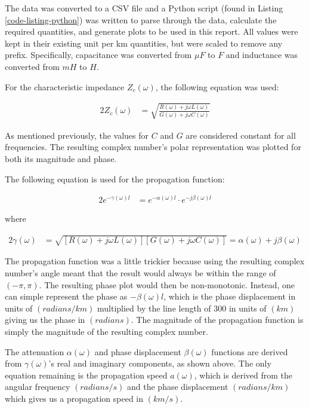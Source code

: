 \documentclass[10pt, oneside, letterpaper]{article}
\begin{document}
The data was converted to a CSV file and a Python script (found in Listing \ref{code-listing-python}) was written to parse through the data, calculate the required quantities, and generate plots to be used in this report. All values were kept in their existing unit per km quantities, but were scaled to remove any prefix. Specifically, capacitance was converted from $\mu{}F$ to $F$ and inductance was converted from $mH$ to $H$.

For the characteristic impedance $Z_c(\omega)$, the following equation was used:

\begin{alignat}{2}
Z_c(\omega) &= \sqrt{\frac{R(\omega{}) + j\omega{}L(\omega{})}{G(\omega{}) + j\omega{}C(\omega{})}}
\end{alignat}

As mentioned previously, the values for $C$ and $G$ are considered constant for all frequencies. The resulting complex number's polar representation was plotted for both its magnitude and phase.

The following equation is used for the propagation function:

\begin{alignat}{2}
e^{-\gamma{}(\omega{})l} &= e^{-\alpha{}(\omega{})l}\cdot{}e^{-j\beta{}(\omega{})l}
\end{alignat}

where

\begin{alignat}{2}
\gamma{}(\omega{}) &= \sqrt{\left[R(\omega{})+j\omega{}L(\omega{})\right]\left[G(\omega{})+j\omega{}C(\omega{})\right]} = \alpha(\omega{}) + j\beta(\omega{})
\end{alignat}

The propagation function was a little trickier because using the resulting complex number's angle meant that the result would always be within the range of $(-\pi,\pi)$. The resulting phase plot would then be non-monotonic. Instead, one can simple represent the phase as $-\beta{}(\omega{})l$, which is the phase displacement in units of $(radians/km)$ multiplied by the line length of 300 in units of $(km)$ giving us the phase in $(radians)$. The magnitude of the propagation function is simply the magnitude of the resulting complex number.

The attenuation $\alpha{}(\omega{})$ and phase displacement $\beta{}(\omega{})$ functions are derived from $\gamma{}(\omega{})$'s real and imaginary components, as shown above. The only equation remaining is the propagation speed $a(\omega{})$, which is derived from the angular frequency $(radians/s)$ and the phase displacement $(radians/km)$ which gives us a propagation speed in $(km/s)$.
\end{document}
